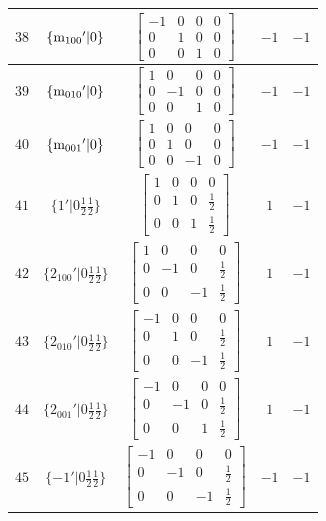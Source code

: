 \documentclass[fleqn,8pt]{jsarticle}
\begin{document}
\begin{longtable}{ccccc}
$ 38 $ & $ \{{\rm m}_{100}{}'|0\} $ & $ \begin{bmatrix} -1 & 0 & 0 & 0 \\ 0 & 1 & 0 & 0 \\ 0 & 0 & 1 & 0 \end{bmatrix} $ & $ -1 $ & $ -1 $ \\ \hline
$ 39 $ & $ \{{\rm m}_{010}{}'|0\} $ & $ \begin{bmatrix} 1 & 0 & 0 & 0 \\ 0 & -1 & 0 & 0 \\ 0 & 0 & 1 & 0 \end{bmatrix} $ & $ -1 $ & $ -1 $ \\ \hline
$ 40 $ & $ \{{\rm m}_{001}{}'|0\} $ & $ \begin{bmatrix} 1 & 0 & 0 & 0 \\ 0 & 1 & 0 & 0 \\ 0 & 0 & -1 & 0 \end{bmatrix} $ & $ -1 $ & $ -1 $ \\ \hline
$ 41 $ & $ \{1{}'|0 \frac{1}{2} \frac{1}{2}\} $ & $ \begin{bmatrix} 1 & 0 & 0 & 0 \\ 0 & 1 & 0 & \frac{1}{2} \\ 0 & 0 & 1 & \frac{1}{2} \end{bmatrix} $ & $ 1 $ & $ -1 $ \\ \hline
$ 42 $ & $ \{2{}_{100}{}'|0 \frac{1}{2} \frac{1}{2}\} $ & $ \begin{bmatrix} 1 & 0 & 0 & 0 \\ 0 & -1 & 0 & \frac{1}{2} \\ 0 & 0 & -1 & \frac{1}{2} \end{bmatrix} $ & $ 1 $ & $ -1 $ \\ \hline
$ 43 $ & $ \{2{}_{010}{}'|0 \frac{1}{2} \frac{1}{2}\} $ & $ \begin{bmatrix} -1 & 0 & 0 & 0 \\ 0 & 1 & 0 & \frac{1}{2} \\ 0 & 0 & -1 & \frac{1}{2} \end{bmatrix} $ & $ 1 $ & $ -1 $ \\ \hline
$ 44 $ & $ \{2{}_{001}{}'|0 \frac{1}{2} \frac{1}{2}\} $ & $ \begin{bmatrix} -1 & 0 & 0 & 0 \\ 0 & -1 & 0 & \frac{1}{2} \\ 0 & 0 & 1 & \frac{1}{2} \end{bmatrix} $ & $ 1 $ & $ -1 $ \\ \hline
$ 45 $ & $ \{-1{}'|0 \frac{1}{2} \frac{1}{2}\} $ & $ \begin{bmatrix} -1 & 0 & 0 & 0 \\ 0 & -1 & 0 & \frac{1}{2} \\ 0 & 0 & -1 & \frac{1}{2} \end{bmatrix} $ & $ -1 $ & $ -1 $ \\ \hline

\end{longtable}
\end{document}
